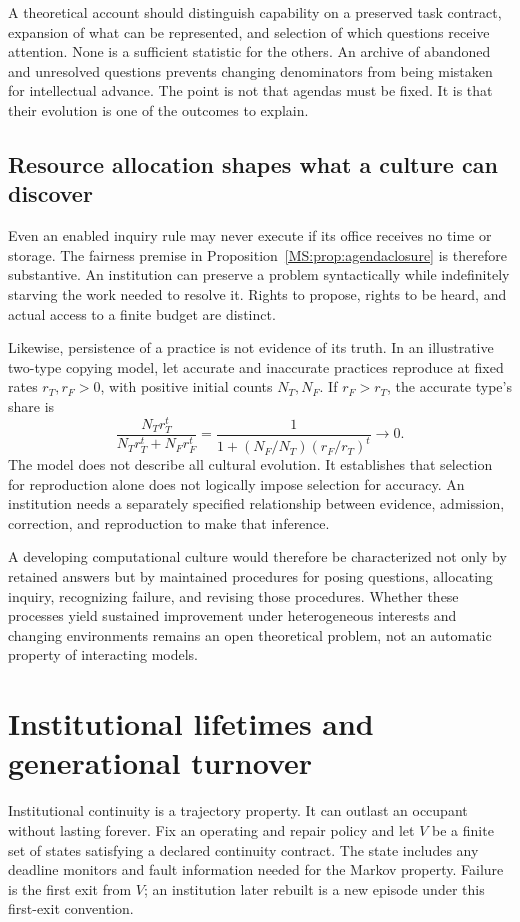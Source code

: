 A theoretical account should distinguish capability on a preserved task contract, expansion of what can be represented, and selection of which questions receive attention. None is a sufficient statistic for the others. An archive of abandoned and unresolved questions prevents changing denominators from being mistaken for intellectual advance. The point is not that agendas must be fixed. It is that their evolution is one of the outcomes to explain.

\subsection{Resource allocation shapes what a culture can discover}
Even an enabled inquiry rule may never execute if its office receives no time or storage. The fairness premise in Proposition~\ref{MS:prop:agendaclosure} is therefore substantive. An institution can preserve a problem syntactically while indefinitely starving the work needed to resolve it. Rights to propose, rights to be heard, and actual access to a finite budget are distinct.

Likewise, persistence of a practice is not evidence of its truth. In an illustrative two-type copying model, let accurate and inaccurate practices reproduce at fixed rates $r_T,r_F>0$, with positive initial counts $N_T,N_F$. If $r_F>r_T$, the accurate type's share is
\[
\frac{N_T r_T^t}{N_T r_T^t+N_F r_F^t}
=\frac{1}{1+(N_F/N_T)(r_F/r_T)^t}\longrightarrow0.
\]
The model does not describe all cultural evolution. It establishes that selection for reproduction alone does not logically impose selection for accuracy. An institution needs a separately specified relationship between evidence, admission, correction, and reproduction to make that inference.

A developing computational culture would therefore be characterized not only by retained answers but by maintained procedures for posing questions, allocating inquiry, recognizing failure, and revising those procedures. Whether these processes yield sustained improvement under heterogeneous interests and changing environments remains an open theoretical problem, not an automatic property of interacting models.

\section{Institutional lifetimes and generational turnover}\label{MS:sec:lifetime}
Institutional continuity is a trajectory property. It can outlast an occupant without lasting forever. Fix an operating and repair policy and let $V$ be a finite set of states satisfying a declared continuity contract. The state includes any deadline monitors and fault information needed for the Markov property. Failure is the first exit from $V$; an institution later rebuilt is a new episode under this first-exit convention.

